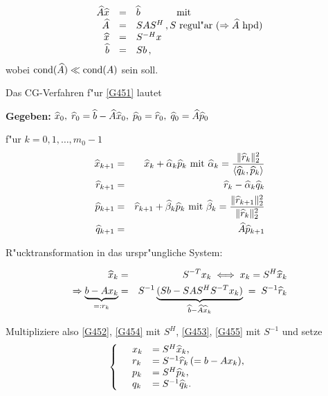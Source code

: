 \begin{eqnarray}\label{G451}
\begin{array}{rcl}
\widehat{A} \widehat{x} & = & \widehat{b} \hspace{1.2cm} \mbox{ mit } \\
\widehat{A} & = & S A S^H \, , S \mbox{ regul"ar } ( \Rightarrow \widehat{A} \mbox{ hpd}) \\
\widehat{x} & = & S^{-H} x \\
\widehat{b} & = & S b \, ,
\end{array}
\end{eqnarray}
wobei $ \mbox{cond}(\widehat{A}) \ll \mbox{cond}(A) $ sein soll.



Das CG-Verfahren f"ur \eqref{G451} lautet \smallskip


\noindent\textbf{Gegeben:} $ \widehat{x}_0, \;  \widehat{r}_0 = \widehat{b} - \widehat{A} \widehat{x}_0, \; \widehat{p}_0 = \widehat{r}_0, \;
\widehat{q}_0 = \widehat{A} \widehat{p}_0 $

\medskip

\noindent f"ur $ k = 0, 1, \ldots, m_0 -1 $
\begin{eqnarray}\label{G452}
\widehat{x}_{k+1} &=& \widehat{x}_k + \widehat{\alpha}_k \widehat{p}_k \mbox{ mit }
\widehat{\alpha}_k = \frac{\| \widehat{r}_k \|_2^2}{\langle \widehat{q}_k, \widehat{p}_k \rangle}\\
\widehat{r}_{k+1} & = & \widehat{r}_k - \widehat{\alpha}_k \widehat{q}_k \label{G453}\\
\widehat{p}_{k+1} & = & \widehat{r}_{k+1} + \widehat{\beta}_k\widehat{p}_k \label{G454}
\mbox{ mit } \widehat{\beta}_k = \frac{\| \widehat{r}_{k+1} \|_2^2}{\| \widehat{r}_k \|_2^2} \\
\widehat{q}_{k+1} & = & \widehat{A} \widehat{p}_{k+1} \label{G455}
\end{eqnarray}

\noindent R"ucktransformation in das urspr"ungliche System:

\begin{eqnarray*}
\widehat{x}_k & = &S^{-T} x_k \iff x_k = S^H \widehat{x}_k \\
\Rightarrow \underbrace{b - A x_k}_{=: r_k} & = & S^{-1}
\underbrace{(S b - S A S^H S^{-T} x_k)}_{\widehat{b} - \widehat{A} \widehat{x}_k}\; = \; S^{-1} \widehat{r}_k
\end{eqnarray*}

\noindent Multipliziere also \eqref{G452}, \eqref{G454} mit $ S^H$, \eqref{G453},
\eqref{G455} mit $ S^{-1}$ und setze
\begin{equation}
\left\{ \quad  \begin{array}{ll}
x_k &= S^H \widehat{x}_k, \\ r_k&= S^{-1} \widehat{r}_k \, ( = b - A x_k), \\ p_k &= S^H \widehat{p}_k, \\ q_k &= S^{-1} \widehat{q}_k .
\end{array}\right.\label{transf_eq}
\end{equation}
\medskip

